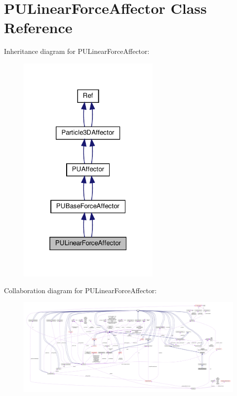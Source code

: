 \hypertarget{classPULinearForceAffector}{}\section{P\+U\+Linear\+Force\+Affector Class Reference}
\label{classPULinearForceAffector}


Inheritance diagram for P\+U\+Linear\+Force\+Affector\+:
\nopagebreak
\begin{figure}[H]
\begin{center}
\leavevmode
\includegraphics[width=196pt]{classPULinearForceAffector__inherit__graph}
\end{center}
\end{figure}


Collaboration diagram for P\+U\+Linear\+Force\+Affector\+:
\nopagebreak
\begin{figure}[H]
\begin{center}
\leavevmode
\includegraphics[width=350pt]{classPULinearForceAffector__coll__graph}
\end{center}
\end{figure}
